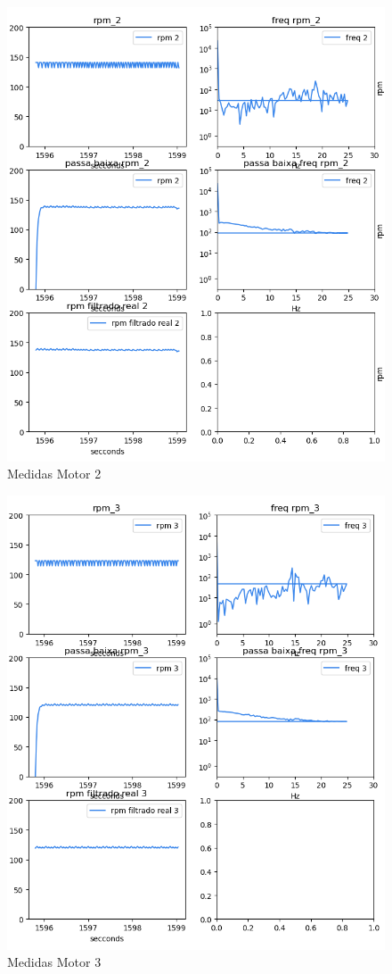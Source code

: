 \begin{figure}[h]
	\centering
	\includegraphics{figures/medidas_motor_2}
	\caption{Medidas Motor 2}
	\label{fig:medidas_motor_2}
\end{figure}


\begin{figure}[h]
	\centering
	\includegraphics{figures/medidas_motor_3}
	\caption{Medidas Motor 3}
	\label{fig:medidas_motor_3}
\end{figure}